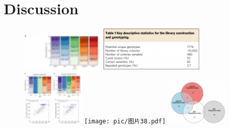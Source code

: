\documentclass{beamer}
\begin{document}
\section{Discussion}
\begin{frame}{}
	    \begin{figure}
		\flushleft
		\includegraphics[width=4cm]{pic/图片35.pdf}
		\includegraphics[width=5cm]{pic/图片36.pdf}\\
		\includegraphics[width=3cm]{pic/图片37.pdf}
		\texttt{[image: pic/图片38.pdf]}
		\includegraphics[width=3cm]{pic/图片40.pdf}
 	    \end{figure}
\end{frame}
\end{document}

